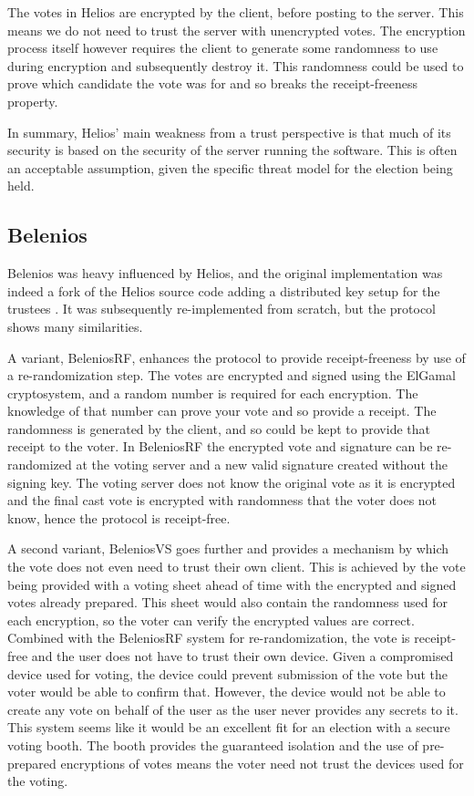 The votes in Helios are encrypted by the client, before posting to the server. This means we do not need to trust the server with unencrypted votes. The encryption process itself however requires the client to generate some randomness to use during encryption and subsequently destroy it. This randomness could be used to prove which candidate the vote was for and so breaks the receipt-freeness property.

In summary, Helios' main weakness from a trust perspective is that much of its security is based on the security of the server running the software. This is often an acceptable assumption, given the specific threat model for the election being held.

\subsection{Belenios}

Belenios was heavy influenced by Helios, and the original implementation was indeed a fork of the Helios source code adding a distributed key setup for the trustees \cite{cortierBeleniosSimplePrivate2019}. It was subsequently re-implemented from scratch, but the protocol shows many similarities.

A variant, BeleniosRF, enhances the protocol to provide receipt-freeness by use of a re-randomization step. The votes are encrypted and signed using the ElGamal cryptosystem, and a random number is required for each encryption. The knowledge of that number can prove your vote and so provide a receipt. The randomness is generated by the client, and so could be kept to provide that receipt to the voter. In BeleniosRF the encrypted vote and signature can be re-randomized at the voting server and a new valid signature created without the signing key. The voting server does not know the original vote as it is encrypted and the final cast vote is encrypted with randomness that the voter does not know, hence the protocol is receipt-free.

A second variant, BeleniosVS goes further and provides a mechanism by which the vote does not even need to trust their own client. This is achieved by the vote being provided with a voting sheet ahead of time with the encrypted and signed votes already prepared. This sheet would also contain the randomness used for each encryption, so the voter can verify the encrypted values are correct. Combined with the BeleniosRF system for re-randomization, the vote is receipt-free and the user does not have to trust their own device. Given a compromised device used for voting, the device could prevent submission of the vote but the voter would be able to confirm that. However, the device would not be able to create any vote on behalf of the user as the user never provides any secrets to it. This system seems like it would be an excellent fit for an election with a secure voting booth. The booth provides the guaranteed isolation and the use of pre-prepared encryptions of votes means the voter need not trust the devices used for the voting.

